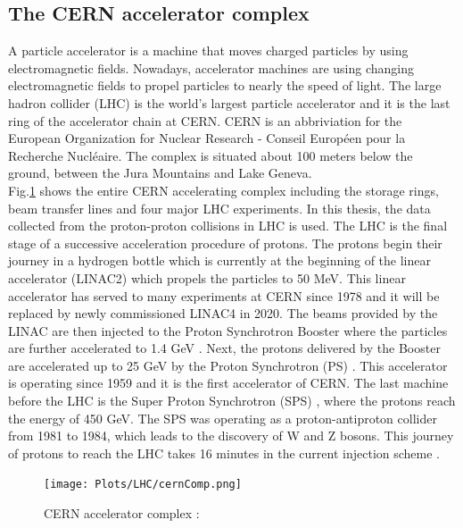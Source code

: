 \subsection{The CERN accelerator complex}
A particle accelerator is a machine that moves charged particles by using electromagnetic fields.  Nowadays, accelerator machines are using changing electromagnetic fields to propel particles to nearly the speed of light. 
The large hadron collider (LHC) is the world's largest particle accelerator and it is the last ring of the accelerator chain at CERN.  CERN is an abbriviation for the European Organization for Nuclear Research - Conseil Europ{\'e}en pour la Recherche Nucl{\'e}aire. 
The complex is situated about 100 meters below the ground, between the Jura Mountains and Lake Geneva. \\ 
Fig.\ref{fig:CERN_complex} shows the entire CERN accelerating complex including the storage rings, beam transfer
lines and four major LHC experiments. 
In this thesis, the data collected from the proton-proton collisions in LHC is used. The LHC is the final stage of a successive acceleration procedure of protons. The protons begin their journey in a hydrogen bottle which is currently at the beginning of the linear accelerator (LINAC2) which propels the particles to 50 MeV. This linear accelerator has served to many experiments at CERN since 1978 and it will be replaced by newly commissioned LINAC4  in 2020\cite{LINAC2}. The beams provided by the LINAC are then injected to the Proton Synchrotron Booster where the particles are further accelerated to 1.4 GeV \cite{Booster}. Next, the protons delivered by the Booster are accelerated up to 25 GeV by the Proton Synchrotron (PS) \cite{PS}. This accelerator is operating since 1959 and it is the first accelerator of CERN.
The last machine before the LHC is the Super Proton Synchrotron (SPS) \cite{SPS}, where the protons reach the energy of 450 GeV. The SPS was operating as a proton-antiproton collider from 1981 to 1984, which leads to the discovery of W \cite{Wboson} and Z \cite{Zboson} bosons. This journey of protons to reach the LHC takes 16 minutes in the current injection scheme \cite{LHCDR}.
\begin{figure}
\begin{center}
\texttt{[image: Plots/LHC/cernComp.png]}
\caption{\label{fig:CERN_complex} CERN accelerator complex \cite{CERN_complex}: }
\end{center}
\end{figure}
